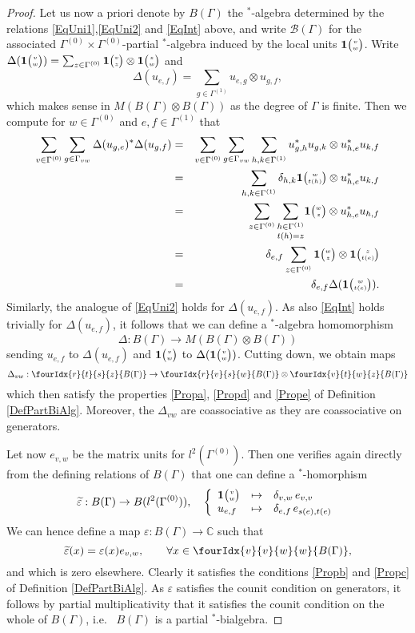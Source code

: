 \documentclass[11pt]{article}
\newcommand{\C}{\mathbb{C}}
\newcommand{\Grt}[3]{#1{\tiny {\begin{pmatrix} #2\\#3\end{pmatrix}}}}
\newcommand{\UnitC}[2]{\Grt{\mathbf{1}}{#1}{#2}}
\newcommand{\Gr}[5]{\fourIdx{#2}{#4}{#3}{#5}{#1}}%
\theoremstyle{definition}
\numberwithin{equation}{section}
\begin{document}
\begin{proof}
Let us now a priori denote by $B(\Gamma)$ the $^*$-algebra determined by the relations \eqref{EqUni1},\eqref{EqUni2} and \eqref{EqInt} above, and write $\mathscr{B}(\Gamma)$ for the associated $\Gamma^{(0)}\times \Gamma^{(0)}$-partial $^*$-algebra induced by the local units $\UnitC{v}{w}$. Write $\Delta(\UnitC{v}{w}) = \sum_{z\in \Gamma^{(0)}} \UnitC{v}{z}\otimes \UnitC{z}{w}$ and \[\Delta(u_{e,f}) = \sum_{g\in \Gamma^{(1)}} u_{e,g}\otimes u_{g,f},\] which makes sense in $M(B(\Gamma)\otimes B(\Gamma))$ as the degree of $\Gamma$ is finite. Then we compute for $w\in \Gamma^{(0)}$ and $e,f\in \Gamma^{(1)}$ that \begin{eqnarray*} \sum_{v\in \Gamma^{(0)}}\sum_{g\in \Gamma_{vw}}\Delta(u_{g,e})^*\Delta(u_{g,f}) &=& \sum_{v\in \Gamma^{(0)}}\sum_{g\in \Gamma_{vw}} \sum_{h,k\in \Gamma^{(1)}} u_{g,h}^*u_{g,k}\otimes u_{h,e}^*u_{k,f}\\ &=& \sum_{h,k\in \Gamma^{(1)}} \delta_{h,k} \UnitC{w}{t(h)}\otimes u_{h,e}^*u_{k,f}\\ &=&  \sum_{z\in \Gamma^{(0)}}\underset{t(h)=z}{\sum_{h\in \Gamma^{(1)}}} \UnitC{w}{z}\otimes u_{h,e}^*u_{h,f} \\ &=& \delta_{e,f} \sum_{z\in \Gamma^{(0)}} \UnitC{w}{z}\otimes \UnitC{z}{t(e)}\\ &=& \delta_{e,f} \Delta(\UnitC{w}{t(e)}).\end{eqnarray*}  Similarly, the analogue of \eqref{EqUni2} holds for $\Delta(u_{e,f})$. As also \eqref{EqInt} holds trivially for $\Delta(u_{e,f})$, it follows that we can define a $^*$-algebra homomorphism \[\Delta:B(\Gamma)\rightarrow M(B(\Gamma)\otimes B(\Gamma))\] sending $u_{e,f}$ to $\Delta(u_{e,f})$ and $\UnitC{v}{w}$ to $\Delta(\UnitC{v}{w})$. Cutting down, we obtain maps \[\Delta_{vw}:\Gr{B(\Gamma)}{r}{s}{t}{z}\rightarrow \Gr{B(\Gamma)}{r}{s}{v}{w}\otimes \Gr{B(\Gamma)}{v}{w}{t}{z}\] which then satisfy the properties \ref{Propa}, \ref{Propd} and \ref{Prope} of Definition \ref{DefPartBiAlg}. Moreover, the $\Delta_{vw}$ are coassociative as they are coassociative on generators.

Let now $e_{v,w}$ be the matrix units for $l^2(\Gamma^{(0)})$. Then one verifies again directly from the defining relations of $B(\Gamma)$ that one can define a $^*$-homorphism \[\widetilde{\varepsilon}: B(\Gamma)\rightarrow B(l^2(\Gamma^{(0)})),\quad \left\{\begin{array}{lll} \UnitC{v}{w}&\mapsto &\delta_{v,w}\, e_{v,v}\\ u_{e,f}&\mapsto& \delta_{e,f}\, e_{s(e),t(e)}\end{array}\right.\] We can hence define a map $\varepsilon: B(\Gamma)\rightarrow \C$ such that \[\widetilde{\varepsilon}(x) = \varepsilon(x) e_{v,w},\qquad  \forall x\in \Gr{B(\Gamma)}{v}{w}{v}{w},\] and which is zero elsewhere. Clearly it satisfies the conditions \ref{Propb} and \ref{Propc} of Definition \ref{DefPartBiAlg}. As $\varepsilon$ satisfies the counit condition on generators, it follows by partial multiplicativity that it satisfies the counit condition on the whole of $B(\Gamma)$, i.e.~ $B(\Gamma)$ is a partial $^*$-bialgebra. 


\end{proof}
\end{document}
